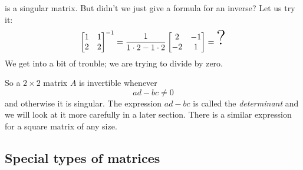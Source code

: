 \documentclass{ximera}
\begin{document}
is a singular matrix. But didn't we just give a formula for an inverse? Let us try it:
\begin{equation*}
    \begin{bmatrix}
        1 & 1 \\
        2 & 2
    \end{bmatrix}^{-1}
    = \frac{1}{1\cdot 2-1 \cdot 2}
    \begin{bmatrix}
        2 & -1 \\
        -2 & 1
    \end{bmatrix}
    =
    \text{\Huge ?}
\end{equation*}
We get into a bit of trouble; we are trying to divide by zero.

So a $2 \times 2$ matrix $A$ is invertible whenever
\begin{equation*}
    ad - bc \not= 0
\end{equation*}
and otherwise it is singular.  The expression $ad-bc$ is called the \emph{determinant} and we will look at it more carefully in a later section. There is a similar expression for a square matrix of any size.

\subsection{Special types of matrices}
\end{document}
